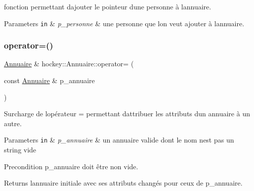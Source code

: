 fonction permettant d\textquotesingle{}ajouter le pointeur d\textquotesingle{}une personne à l\textquotesingle{}annuaire. 


\begin{DoxyParams}[1]{Parameters}
\mbox{\tt in}  & {\em p\+\_\+personne} & une personne que l\textquotesingle{}on veut ajouter à l\textquotesingle{}annuaire. \\
\hline
\end{DoxyParams}
\mbox{\label{classhockey_1_1Annuaire_a1c30829ff248b46717d93583d94bdfa1}} 
\subsubsection{\texorpdfstring{operator=()}{operator=()}}
{\footnotesize\ttfamily \hyperlink{classhockey_1_1Annuaire}{Annuaire} \& hockey\+::\+Annuaire\+::operator= (\begin{DoxyParamCaption}\item[{const \hyperlink{classhockey_1_1Annuaire}{Annuaire} \&}]{p\+\_\+annuaire }\end{DoxyParamCaption})}



Surcharge de l\textquotesingle{}opérateur = permettant d\textquotesingle{}attribuer les attributs d\textquotesingle{}un annuaire à un autre. 


\begin{DoxyParams}[1]{Parameters}
\mbox{\tt in}  & {\em p\+\_\+annuaire} & un annuaire valide dont le nom n\textquotesingle{}est pas un string vide \\
\hline
\end{DoxyParams}
\begin{DoxyPrecond}{Precondition}
p\+\_\+annuaire doit être non vide. 
\end{DoxyPrecond}
\begin{DoxyReturn}{Returns}
l\textquotesingle{}annuaire initiale avec ses attributs changés pour ceux de p\+\_\+annuaire. 
\end{DoxyReturn}
\mbox{\label{classhockey_1_1Annuaire_acc3c0ae6f56007b2c54d3ef2765c6297}} 
